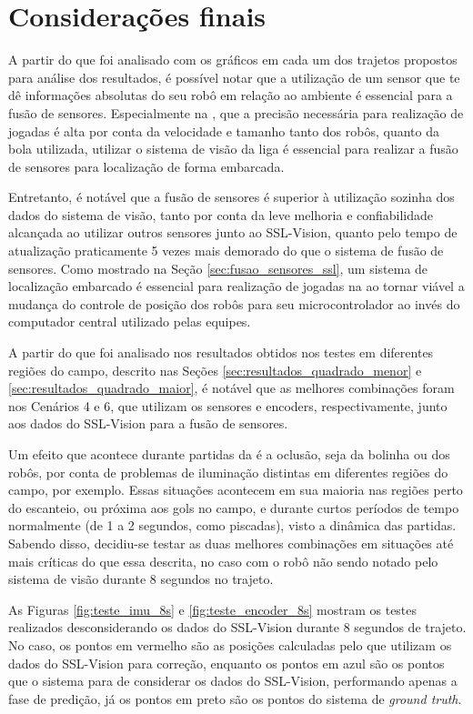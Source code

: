 \documentclass[acronym, symbols, table]{fei}
\begin{document}
	\section{Considerações finais}
	
		A partir do que foi analisado com os gráficos em cada um dos trajetos propostos para análise dos resultados, é possível notar que a utilização de um sensor que te dê informações absolutas do seu robô em relação ao ambiente é essencial para a fusão de sensores. Especialmente na , que a precisão necessária para realização de jogadas é alta por conta da velocidade e tamanho tanto dos robôs, quanto da bola utilizada, utilizar o sistema de visão da liga é essencial para realizar a fusão de sensores para localização de forma embarcada.
		
		Entretanto, é notável que a fusão de sensores é superior à utilização sozinha dos dados do sistema de visão, tanto por conta da leve melhoria e confiabilidade alcançada ao utilizar outros sensores junto ao SSL-Vision, quanto pelo tempo de atualização praticamente 5 vezes mais demorado do que o sistema de fusão de sensores. Como mostrado na Seção \ref{sec:fusao_sensores_ssl}, um sistema de localização embarcado é essencial para realização de jogadas na  ao tornar viável a mudança do controle de posição dos robôs para seu microcontrolador ao invés do computador central utilizado pelas equipes.
		
		A partir do que foi analisado nos resultados obtidos nos testes em diferentes regiões do campo, descrito nas Seções \ref{sec:resultados_quadrado_menor} e \ref{sec:resultados_quadrado_maior}, é notável que as melhores combinações foram nos Cenários 4 e 6, que utilizam os sensores  e encoders, respectivamente, junto aos dados do SSL-Vision para a fusão de sensores.
		
		Um efeito que acontece durante partidas da  é a oclusão, seja da bolinha ou dos robôs, por conta de problemas de iluminação distintas em diferentes regiões do campo, por exemplo. Essas situações acontecem em sua maioria nas regiões perto do escanteio, ou próxima aos gols no campo, e durante curtos períodos de tempo normalmente (de 1 a 2 segundos, como piscadas), visto a dinâmica das partidas. Sabendo disso, decidiu-se testar as duas melhores combinações em situações até mais críticas do que essa descrita, no caso com o robô não sendo notado pelo sistema de visão durante 8 segundos no trajeto.
		
		As Figuras \ref{fig:teste_imu_8s} e \ref{fig:teste_encoder_8s} mostram os testes realizados desconsiderando os dados do SSL-Vision durante 8 segundos de trajeto. No caso, os pontos em vermelho são as posições calculadas pelo  que utilizam os dados do SSL-Vision para correção, enquanto os pontos em azul são os pontos que o sistema para de considerar os dados do SSL-Vision, performando apenas a fase de predição, já os pontos em preto são os pontos do sistema de \textit{ground truth}.
		
\end{document}
